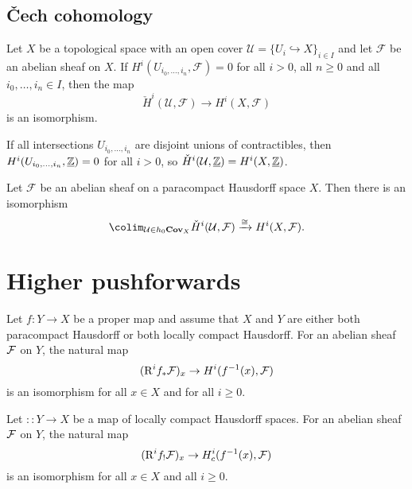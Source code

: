 \subsection{Čech cohomology}

\begin{prop}[name={\cref{cor:Čech-cohomology-vanishing-intersections}}]
Let \(X\) be a topological space with an open cover \(\mathcal U=\{U_i\hookrightarrow X\}_{i\in I}\) and let \(\mathcal F\) be an abelian sheaf on \(X\).
If \(H^i(U_{i_0,\ldots,i_n},\mathcal F)=0\) for all \(i>0\), all \(n\geq 0\) and all \(i_0,\ldots,i_n\in I\), then the map
\[ \check{H}^i(\mathcal U,\mathcal F) \to H^i(X,\mathcal F) \]
is an isomorphism.
\end{prop}

\begin{cor}[name={\cref{exmp:Čech-cohomology-intersections-disjoint-unions-of-contractibles}}]
If all intersections \(U_{i_0,\ldots,i_n}\) are disjoint unions of contractibles, then \(H^i(U_{i_0,\ldots,i_n},\underline{\mathbb{Z}})=0\) for all \(i>0\), so \(\check{H}^i(\mathcal U,\underline{\mathbb{Z}})=H^i(X,\underline{\mathbb{Z}})\).
\end{cor}

\begin{prop}[name={\cref{thm:Čech-cohomology-paracompact-Hausdorff-space}}]
Let \(\mathcal F\) be an abelian sheaf on a paracompact Hausdorff space \(X\).
Then there is an isomorphism
\[ \colim_{\mathcal U\in h_0\catOpenCover{X}}\check{H}^i(\mathcal U,\mathcal F) \xrightarrow{\cong} H^i(X,\mathcal F)\text{.} \]
\end{prop}

\section{Higher pushforwards}

\begin{thm}[name={\cref{thm:proper-base-change-theorem-1}}]
Let $f\colon Y \to X$ be a proper map and assume that $X$ and $Y$ are either both paracompact Hausdorff or both locally compact Hausdorff.
For an abelian sheaf \(\mathcal{F}\) on \(Y\), the natural map \[
  (\rightderived^i f_* \sh{F})_x \to \cohomology^i(f^{-1}(x), \sh{F})
\] is an isomorphism for all $x \in X$ and for all $i \geq 0$.
\end{thm}

\begin{thm}[name={\cref{thm:proper-base-changed-theorem-2}}]
Let $\colon: Y \to X$ be a map of locally compact Hausdorff spaces. For an abelian sheaf \(\mathcal{F}\) on \(Y\), the natural map \[
  (\rightderived^i f_! \sh{F})_x \to \cohomology^i_c(f^{-1}(x), \sh{F})
\] is an isomorphism for all $x \in X$ and all $i \geq 0$.
\end{thm}


